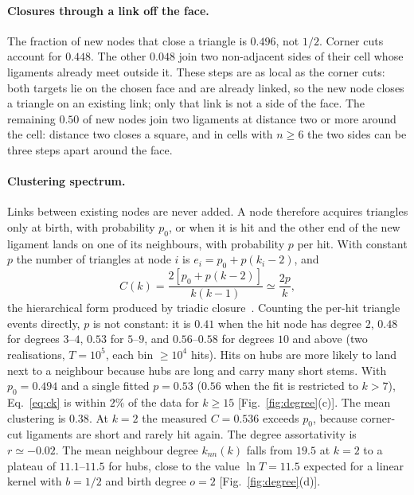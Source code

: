 \documentclass[pre,twocolumn,superscriptaddress,amsmath,amssymb,floatfix]{revtex4-2}
\begin{document}
\paragraph*{Closures through a link off the face.}
The fraction of new nodes that close a triangle is $0.496$, not $1/2$. Corner cuts
account for $0.448$. The other $0.048$ join two non-adjacent sides of their cell whose
ligaments already meet outside it. These steps are as local as the corner cuts: both
targets lie on the chosen face and are already linked, so the new node closes a
triangle on an existing link; only that link is not a side of the face. The remaining $0.50$ of new nodes join two ligaments
at distance two or more around the cell: distance two closes a square, and in cells
with $n\ge6$ the two sides can be three steps apart around the face.

\paragraph*{Clustering spectrum.}
Links between existing nodes are never added. A node therefore acquires triangles only
at birth, with probability $p_0$, or when it is hit and the other end of the new
ligament lands on one of its neighbours, with probability $p$ per hit. With constant
$p$ the number of triangles at node $i$ is $e_i=p_0+p(k_i-2)$, and
\begin{equation}
  C(k)=\frac{2[p_0+p(k-2)]}{k(k-1)}\simeq\frac{2p}{k},
  \label{eq:ck}
\end{equation}
the hierarchical form produced by triadic
closure~\cite{vazquez2003,ravasz2003,holme2002}. Counting the per-hit triangle events
directly, $p$ is not constant: it is $0.41$ when the hit node has degree $2$, $0.48$ for
degrees $3$--$4$, $0.53$ for $5$--$9$, and $0.56$--$0.58$ for degrees $10$ and above
(two realisations, $T=10^5$, each bin $\ge10^4$ hits). Hits on hubs are more likely to
land next to a neighbour because hubs are long and carry many short stems. With
$p_0=0.494$ and a single fitted $p=0.53$ ($0.56$ when the fit is restricted to $k>7$),
Eq.~\eqref{eq:ck} is within $2\%$ of the data for $k\ge15$ [Fig.~\ref{fig:degree}(c)].
The mean clustering is $0.38$. At $k=2$ the measured $C=0.536$ exceeds $p_0$, because
corner-cut ligaments are short and rarely hit again. The degree assortativity is
$r\simeq-0.02$. The mean neighbour degree $k_{nn}(k)$ falls from $19.5$ at $k=2$ to a
plateau of $11.1$--$11.5$ for hubs, close to the value $\ln T=11.5$ expected for
a linear kernel with $b=1/2$ and birth degree $o=2$ [Fig.~\ref{fig:degree}(d)].
\end{document}
